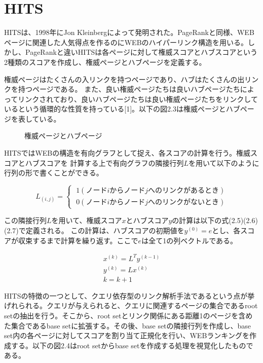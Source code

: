 \documentclass[a4paper,11pt]{jreport}
\begin{document}
\section{HITS}

HITSは、1998年にJon Kleinbergによって発明された。PageRankと同様、WEBページに関連した人気得点を作るのにWEBのハイパーリンク構造を用いる。しかし、PageRankと違いHITSは各ページに対して権威スコアとハブスコアという2種類のスコアを作成し、権威ページとハブページを定義する。

権威ページはたくさんの入リンクを持つページであり、ハブはたくさんの出リンクを持つページである。
また、良い権威ページたちは良いハブページたちによってリンクされており、良いハブページたちは良い権威ページたちをリンクしているという循環的な性質を持っている[1]。以下の図2.3は権威ページとハブページを表している。

\begin{figure}[htbp]
\begin{center}
\end{center}
\caption{権威ページとハブページ}
\label{figure:sample}
\end{figure}

HITSではWEBの構造を有向グラフとして捉え、各スコアの計算を行う。権威スコアとハブスコアを
計算する上で有向グラフの隣接行列$L$を用いて以下のように行列の形で書くことができる。

\begin{equation}
L_{(i,j)} =
\begin{cases}
\; 1　(ノードiからノードjへのリンクがあるとき) \\
\; 0　(ノードiからノードjへのリンクがないとき)
\end{cases}
\end{equation}

この隣接行列$L$を用いて、権威スコア$x$とハブスコア$y$の計算は以下の式(2.5)(2.6)(2.7)で定義される。
この計算は、ハブスコアの初期値を$y^{(0)} = e$とし、各スコアが収束するまで計算を繰り返す。ここで$e$は全て1の列ベクトルである。

\begin{eqnarray}
x^{(k)} = L^Ty^{(k-1)} \\
y^{(k)} = Lx^{(k)} \\
k = k + 1
\end{eqnarray}

HITSの特徴の一つとして、クエリ依存型のリンク解析手法であるという点が挙げれられる。クエリが与えられると、クエリに関連するページの集合であるroot setの抽出を行う。そこから、root setとリンク関係にある距離1のページを含めた集合であるbase setに拡張する。その後、base setの隣接行列を作成し、base set内の各ページに対してスコアを割り当て正規化を行い、WEBランキングを作成する。以下の図2.4はroot setからbase setを作成する処理を視覚化したものである。
\end{document}

